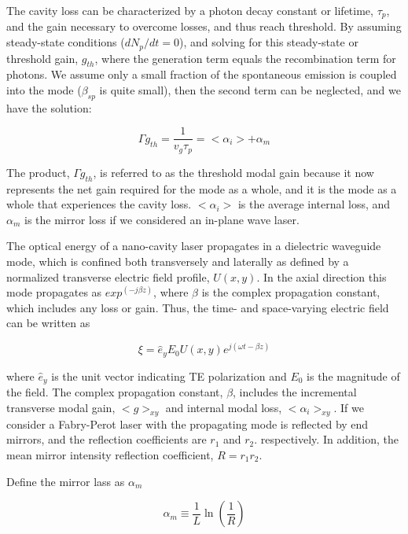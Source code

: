 The cavity loss can be characterized by a photon decay constant or lifetime,
$\tau_p$, and the gain necessary to overcome losses, and thus reach threshold.
By assuming steady-state conditions (\ie $dN_p/dt = 0$), and solving for this
steady-state or threshold gain, $g_{th}$, where the generation term equals the
recombination term for photons. We assume only a small fraction of the
spontaneous emission is coupled into the mode (\ie $\beta_{sp}$ is quite
small), then the second term can be neglected, and we have the solution:

\begin{equation}
  \Gamma{g_{th}} = \frac{1}{v_g\tau_p} = <\alpha_i> + \alpha_m
\end{equation}

The product, $\Gamma{g_{th}}$, is referred to as the threshold modal gain
because it now represents the net gain required for the mode as a whole, and it
is the mode as a whole that experiences the cavity loss. $<\alpha_i>$ is the
average internal loss, and $\alpha_m$ is the mirror loss if we considered an
in-plane wave laser.

The optical energy of a nano-cavity laser propagates in a dielectric waveguide
mode, which is confined both transversely and laterally as defined by a
normalized transverse electric field profile, $U(x,y)$. In the axial direction
this mode propagates as $exp^{(-j\beta z)}$, where $\beta$ is the complex
propagation constant, which includes any loss or gain. Thus, the time- and
space-varying electric field can be written as

\begin{equation}
  \xi = \hat{e}_{y}E_{0}U(x,y)e^{j(\omega t- \beta z)}
\end{equation}

where $\hat{e}_y$ is the unit vector indicating TE polarization and $E_0$ is
the magnitude of the field. The complex propagation constant, $\beta$, includes
the incremental transverse modal gain, $<g>_{xy}$ and internal modal loss,
$<\alpha_i>_{xy}$. If we consider a Fabry-Perot laser with the propagating mode
is reflected by end mirrors, and the reflection coefficients are $r_1$ and
$r_2$. respectively. In addition, the mean mirror intensity reflection
coefficient, $R = r_1r_2$.

Define the mirror lass as $\alpha_m$

\begin{equation}
  \alpha_m \equiv \frac{1}{L}\ln(\frac{1}{R})
\end{equation}

